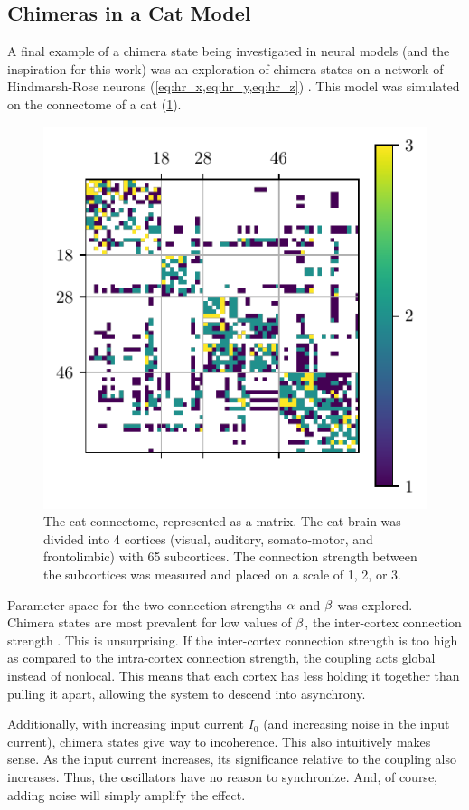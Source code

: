 \subsection{Chimeras in a Cat Model}
\label{sec:lit_review_chimera_cat}
A final example of a chimera state being investigated in neural models (and the inspiration for this work) was an exploration of chimera states on a network of Hindmarsh-Rose neurons (\cref{eq:hr_x,eq:hr_y,eq:hr_z}) \cite{Santos2017}.
This model was simulated on the connectome of a cat (\cref{fig:cat_matrix}).
\begin{figure}[ht]
  \centering
  \includegraphics{figure/cat_matrix}
  \caption[Cat connectome]{The cat connectome, represented as a matrix.
    The cat brain was divided into 4 cortices (visual, auditory, somato-motor, and frontolimbic) with 65 subcortices.
    The connection strength between the subcortices was measured and placed on a scale of 1, 2, or 3.
  }
  \label{fig:cat_matrix}
\end{figure}
Parameter space for the two connection strengths $\alpha$ and $\beta$ was explored.
Chimera states are most prevalent for low values of $\beta$, the inter-cortex connection strength \cite{Santos2017}.
This is unsurprising.
If the inter-cortex connection strength is too high as compared to the intra-cortex connection strength, the coupling acts global instead of nonlocal.
This means that each cortex has less holding it together than pulling it apart, allowing the system to descend into asynchrony.

Additionally, with increasing input current $I_{0}$ (and increasing noise in the input current), chimera states give way to incoherence.
This also intuitively makes sense.
As the input current increases, its significance relative to the coupling also increases.
Thus, the oscillators have no reason to synchronize.
And, of course, adding noise will simply amplify the effect.
